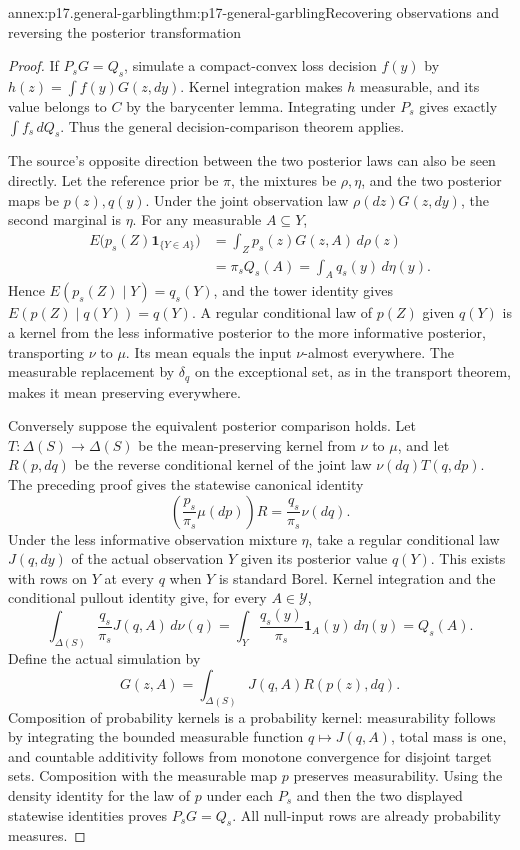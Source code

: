 \begin{annexitem}{annex:p17.general-garbling}{thm:p17-general-garbling}{Recovering observations and reversing the posterior transformation}
\begin{proof}
If \(P_sG=Q_s\), simulate a compact-convex loss decision \(f(y)\)
by \(h(z)=\int f(y)G(z,dy)\).
Kernel integration makes \(h\) measurable, and its value belongs
to \(C\) by the barycenter lemma.
Integrating under \(P_s\) gives exactly \(\int f_s\,dQ_s\).
Thus the general decision-comparison theorem applies.

The source's opposite direction between the two posterior laws can
also be seen directly. Let the reference prior be \(\pi\), the
mixtures be \(\rho,\eta\), and the two posterior maps be \(p(z),q(y)\).
Under the joint observation law \(\rho(dz)G(z,dy)\),
the second marginal is \(\eta\).
For any measurable \(A\subseteq Y\),
\[
 \begin{aligned}
 E\bigl(p_s(Z)\mathbf1_{\{Y\in A\}}\bigr)
   &=\int_Zp_s(z)G(z,A)\,d\rho(z)\\
   &=\pi_sQ_s(A)=\int_Aq_s(y)\,d\eta(y).
 \end{aligned}
\]
Hence \(E(p_s(Z)\mid Y)=q_s(Y)\), and the tower identity gives
\(E(p(Z)\mid q(Y))=q(Y)\).
A regular conditional law of \(p(Z)\) given \(q(Y)\) is a
kernel from the less informative posterior to the more informative
posterior, transporting \(\nu\) to \(\mu\).
Its mean equals the input \(\nu\)-almost everywhere.
The measurable replacement by \(\delta_q\) on the exceptional set,
as in the transport theorem, makes it mean preserving everywhere.

Conversely suppose the equivalent posterior comparison holds.
Let \(T:\Delta(S)\to\Delta(S)\) be the mean-preserving kernel
from \(\nu\) to \(\mu\), and let \(R(p,dq)\) be the reverse
conditional kernel of the joint law \(\nu(dq)T(q,dp)\).
The preceding proof gives the statewise canonical identity
\[
                 \left(\frac{p_s}{\pi_s}\mu(dp)\right)R
                                =\frac{q_s}{\pi_s}\nu(dq).
\]
Under the less informative observation mixture \(\eta\), take a
regular conditional law \(J(q,dy)\) of the actual observation \(Y\)
given its posterior value \(q(Y)\).
This exists with rows on \(Y\) at every \(q\) when \(Y\) is
standard Borel. Kernel integration and the conditional pullout
identity give, for every \(A\in\mathcal Y\),
\[
 \int_{\Delta(S)}\frac{q_s}{\pi_s}J(q,A)\,d\nu(q)
       =\int_Y\frac{q_s(y)}{\pi_s}\mathbf1_A(y)\,d\eta(y)=Q_s(A).
\]
Define the actual simulation by
\[
                          G(z,A)=\int_{\Delta(S)}
                                         J(q,A)R(p(z),dq).
\]
Composition of probability kernels is a probability kernel:
measurability follows by integrating the bounded measurable
function \(q\mapsto J(q,A)\), total mass is one, and countable
additivity follows from monotone convergence for disjoint target
sets. Composition with the measurable map \(p\) preserves measurability.
Using the density identity for the law of \(p\) under each \(P_s\)
and then the two displayed statewise identities proves \(P_sG=Q_s\).
All null-input rows are already probability measures.


\end{proof}
\end{annexitem}
